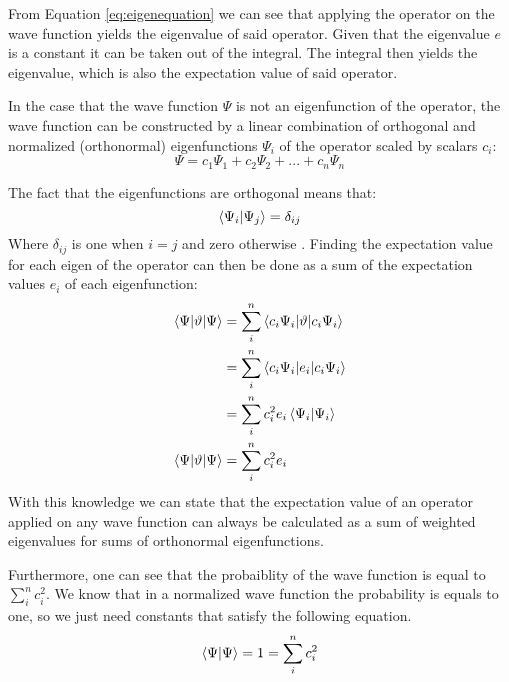\documentclass[../master_thesis.tex]{subfiles}
\begin{document}
From Equation \ref{eq:eigenequation} we can see that applying the operator on
the wave function yields the eigenvalue of said operator. Given that the
eigenvalue $e$ is a constant it can be taken out of the integral. The integral
then yields the eigenvalue, which is also the expectation value of said
operator.

In the case that the wave function $\Psi$ is not an eigenfunction of the
operator, the wave function can be constructed by a linear combination of
orthogonal and normalized (orthonormal\cite{Jensen:2017}) eigenfunctions
$\Psi_i$ of the operator \cite{Atkins:2014} scaled by scalars $c_i$:
\begin{equation}
  \Psi = c_1\Psi_1 + c_2\Psi_2 + ... + c_n\Psi_n \label{eq:lincomb}
\end{equation}

The fact that the eigenfunctions are orthogonal means that:
\begin{equation}
  \braket{\Psi_i|\Psi_j} = \delta _{ij}
\end{equation}
Where $ \delta_{ij} $ is one when $i=j$ and zero otherwise \cite{Cramer:2004}.
Finding the expectation value for each eigen of the operator can then be done
as a sum of the expectation values $e_i$ of each eigenfunction:
\begin{align}
  \begin{split}
    \braket{\Psi|\vartheta|\Psi} &=
    \sum\limits_i^n\braket{c_i\Psi_i|\vartheta|c_i\Psi_i} \\
    &= \sum\limits_i^n\braket{c_i\Psi_i|e_i|c_i\Psi_i} \\
    &= \sum\limits_i^nc_i^2e_i\braket{\Psi_i|\Psi_i} \\
    \braket{\Psi|\vartheta|\Psi} &= \sum\limits_i^nc_i^2e_i\label{eq:arbeval}
  \end{split}
\end{align}
With this knowledge we can state that the expectation value of an operator
applied on any wave function can always be calculated as a sum of weighted
eigenvalues for sums of orthonormal eigenfunctions.

Furthermore, one can see that the probaiblity of the wave function is equal to
$\sum_i^nc_i^2$. We know that in a normalized wave function the
probability is equals to one, so we just need constants that satisfy the
following equation.
\begin{equation}
  \braket{\Psi|\Psi} = 1 = \sum\limits_i^nc_i^2\label{eq:arbprob}
\end{equation}
\end{document}
